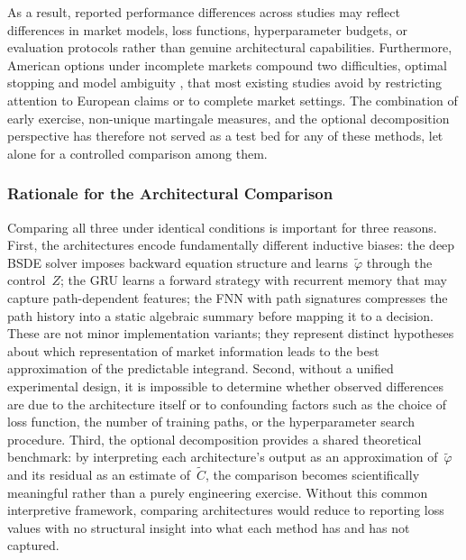 As a result, reported performance differences across studies may reflect differences in market models, loss functions, hyperparameter budgets, or evaluation protocols rather than genuine
architectural capabilities.  Furthermore, American options under incomplete
markets compound two difficulties, optimal stopping and model ambiguity
, that most existing studies avoid by restricting attention to European
claims or to complete market settings.  The combination of early exercise,
non-unique martingale measures, and the optional decomposition perspective
has therefore not served as a test bed for any of these methods, let alone
for a controlled comparison among them.

\subsubsection*{Rationale for the Architectural Comparison}
Comparing all three under identical conditions is important for three
reasons.  First, the architectures encode fundamentally different inductive
biases: the deep BSDE solver imposes backward equation structure and
learns~$\tilde{\varphi}$ through the control~$Z$; the GRU learns a
forward strategy with recurrent memory that may capture path-dependent
features; the FNN with path signatures compresses the path history into a
static algebraic summary before mapping it to a decision.  These are not
minor implementation variants; they represent distinct hypotheses about
which representation of market information leads to the best approximation
of the predictable integrand.  Second, without a unified experimental
design, it is impossible to determine whether observed differences are due
to the architecture itself or to confounding factors such as the choice of
loss function, the number of training paths, or the hyperparameter search
procedure.  Third, the optional decomposition provides a shared
theoretical benchmark: by interpreting each architecture's output as an
approximation of~$\tilde{\varphi}$ and its residual as an estimate
of~$\tilde{C}$, the comparison becomes scientifically meaningful rather
than a purely engineering exercise.  Without this common interpretive
framework, comparing architectures would reduce to reporting loss values
with no structural insight into what each method has and has not captured.


